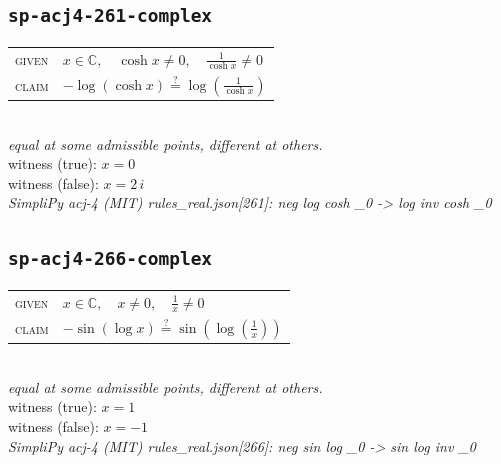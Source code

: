 \documentclass[11pt]{article}
\begin{document}
\subsection*{\texttt{sp-acj4-261-complex}}
\begin{tabular}{@{}l@{\quad}l@{}}
\textsc{given} & $x \in \mathbb{C},\quad \cosh x \neq 0,\quad \frac{1}{\cosh x} \neq 0$ \\[4pt]
\textsc{claim} & $\displaystyle -\log\left(\cosh x\right) \overset{?}{=} \log\left(\frac{1}{\cosh x}\right)$ \\
\end{tabular}\\[2pt]
{\small\emph{equal at some admissible points, different at others.}}\\
{\footnotesize\color{gray}witness (true): $x = 0$}\\
{\footnotesize\color{gray}witness (false): $x = 2 \, i$}\\
\emph{SimpliPy acj-4 (MIT) rules\_real.json[261]: neg log cosh \_0  ->  log inv cosh \_0}\\

\subsection*{\texttt{sp-acj4-266-complex}}
\begin{tabular}{@{}l@{\quad}l@{}}
\textsc{given} & $x \in \mathbb{C},\quad x \neq 0,\quad \frac{1}{x} \neq 0$ \\[4pt]
\textsc{claim} & $\displaystyle -\sin\left(\log x\right) \overset{?}{=} \sin\left(\log\left(\frac{1}{x}\right)\right)$ \\
\end{tabular}\\[2pt]
{\small\emph{equal at some admissible points, different at others.}}\\
{\footnotesize\color{gray}witness (true): $x = 1$}\\
{\footnotesize\color{gray}witness (false): $x = -1$}\\
\emph{SimpliPy acj-4 (MIT) rules\_real.json[266]: neg sin log \_0  ->  sin log inv \_0}\\
\end{document}
